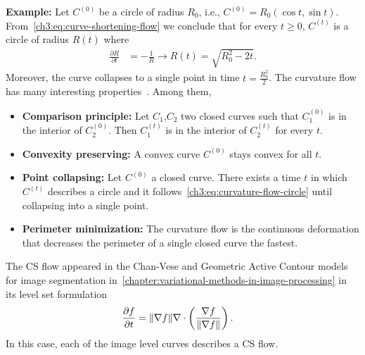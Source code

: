 %
%
\textbf{Example:} Let $C^{(0)}$ be a circle of radius $R_0$, i.e.,  $C^{(0)} = R_0( \cos t, \sin t)$. From~\cref{ch3:eq:curve-shortening-flow} we conclude that for every $t \geq 0$, $C^{(t)}$ is a circle of radius $R(t)$ where
\begin{align}
	\frac{\partial R}{\partial t} &= -\frac{1}{R}  \rightarrow R(t) = \sqrt{R_0^2 - 2t}.
	\label{ch3:eq:curvature-flow-circle}
\end{align}
%
Moreover, the curve collapses to a single point in time $t=\frac{R_0^2}{2}$. The curvature flow has many interesting properties~\cite{huisken84flow,gage86heat,ecker08heat}. Among them,

\begin{itemize}
	\item[]{\textbf{Comparison principle:} Let $C_1$,$C_2$ two closed curves such that $C_1^{(0)}$ is in the interior of $C_2^{(0)}$. Then $C_1^{(t)}$ is in the interior of $C_2^{(t)}$ for every $t$.}
	\item[]{\textbf{Convexity preserving:} A convex curve $C^{(0)}$ stays convex for all $t$.}
	\item[]{\textbf{Point collapsing:} Let $C^{(0)}$ a closed curve. There exists a time $t$ in which $C^{(t)}$ describes a circle and it follows~\cref{ch3:eq:curvature-flow-circle} until collapsing into a single point.}
	\item[]{\textbf{Perimeter minimization:} The curvature flow is the continuous deformation that decreases the perimeter of a single closed curve the fastest.}
\end{itemize}


The CS flow appeared in the Chan-Vese and Geometric Active Contour models for image segmentation in~\cref{chapter:variational-methods-in-image-processing} in its level set formulation~\cite{osher88fronts}
\begin{align}
	\frac{\partial f}{\partial t} &= \lVert\nabla f\rVert\nabla \cdot \left( \frac{\nabla f}{\lVert\nabla f\rVert} \right).
	\label{ch3:eq:implicit-curvature-flow}
\end{align}
%
In this case, each of the image level curves describes a CS flow.


